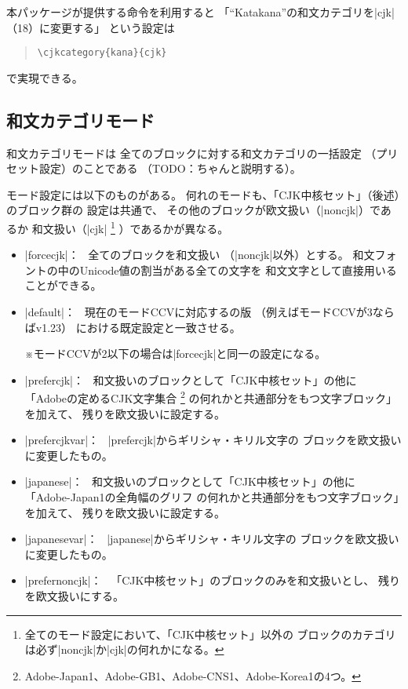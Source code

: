 \documentclass[uplatex,dvipdfmx,a4paper]{jsarticle}
\newcommand{\Note}{\par\noindent ※}
\newcommand{\Means}{：~}
\newcommand{\strong}{\textsf}
\begin{document}
本パッケージが提供する命令を利用すると
「“Katakana”の和文カテゴリを|cjk|（18）に変更する」
という設定は
\begin{quote}\small
\begin{verbatim}
\cjkcategory{kana}{cjk}
\end{verbatim}
\end{quote}
で実現できる。

\subsection{和文カテゴリモード}
\label{ssec:cjkcategory-mode}

\strong{和文カテゴリモード}は
全てのブロックに対する和文カテゴリの一括設定
（プリセット設定）のことである
（TODO：ちゃんと説明する）。

モード設定には以下のものがある。
何れのモードも、「CJK中核セット」（後述）のブロック群の
設定は共通で、
その他のブロックが欧文扱い（|noncjk|）であるか
和文扱い（|cjk|%
\footnote{全てのモード設定において、「CJK中核セット」\strong{以外}の
  ブロックのカテゴリは必ず|noncjk|か|cjk|の何れかになる。}%
）であるかが異なる。
\begin{itemize}
\item |forcecjk|\Means
  全てのブロックを和文扱い
  （|noncjk|以外）とする。
  和文フォントの中のUnicode値の割当がある全ての文字を
  和文文字として直接用いることができる。
\item |default|\Means
  現在のモードCCVに対応する{\upTeX}の版
  （例えばモードCCVが3ならばv1.23）
  における既定設定と一致させる。
  \Note モードCCVが2以下の場合は|forcecjk|と同一の設定になる。
\item |prefercjk|\Means
  和文扱いのブロックとして「CJK中核セット」の他に
  「Adobeの定めるCJK文字集合
  \footnote{Adobe-Japan1、Adobe-GB1、Adobe-CNS1、Adobe-Korea1の4つ。}%
  の何れかと共通部分をもつ文字ブロック」を加えて、
  残りを欧文扱いに設定する。
\item |prefercjkvar|\Means\hspace{-.25em}%
  |prefercjk|からギリシャ・キリル文字の
  ブロックを欧文扱いに変更したもの。
\item |japanese|\Means
  和文扱いのブロックとして「CJK中核セット」の他に
  「Adobe-Japan1の全角幅のグリフ
  の何れかと共通部分をもつ文字ブロック」を加えて、
  残りを欧文扱いに設定する。
\item |japanesevar|\Means
  |japanese|からギリシャ・キリル文字の
  ブロックを欧文扱いに変更したもの。
\item |prefernoncjk|\Means
  「CJK中核セット」のブロックのみを和文扱いとし、
  残りを欧文扱いにする。
\end{itemize}
\end{document}
